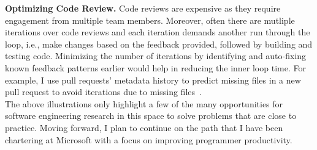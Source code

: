 \documentclass[a4paper]{article}
\begin{document}
\noindent \textbf{Optimizing Code Review.}  Code reviews are expensive as they require engagement from multiple team members. Moreover, often there are mutliple iterations over code reviews and each iteration demands another run through the loop, i.e., make changes based on the feedback provided, followed by building and testing code. Minimizing the number of iterations by identifying and auto-fixing known feedback patterns earlier would help in reducing the inner loop time. For example, I use pull requests' metadata history to predict missing files in a new pull request to avoid iterations due to missing files~\cite{prrecommender}.  \\

The above illustrations only highlight a few of the many opportunities for software engineering research in this space to solve problems that are close to practice. Moving forward, I plan to continue on the path that I have been chartering at Microsoft with a focus on improving programmer productivity.
















\end{document}
